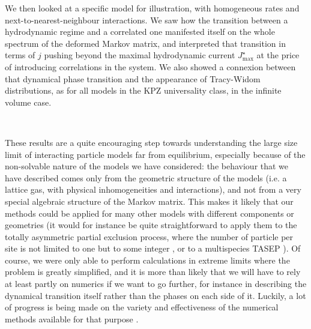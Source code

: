 \documentclass[aps,pre,onecolumn,showpacs,showkeys,a4paper]{revtex4-1}
\begin{document}
We then looked at a specific model for illustration, with homogeneous rates and next-to-nearest-neighbour interactions. We saw how the transition between a hydrodynamic regime and a correlated one manifested itself on the whole spectrum of the deformed Markov matrix, and interpreted that transition in terms of $j$ pushing beyond the maximal hydrodynamic current $J^\star_{\mathrm{max}}$ at the price of introducing correlations in the system. We also showed a connexion between that dynamical phase transition and the appearance of Tracy-Widom distributions, as for all models in the KPZ universality class, in the infinite volume case.


~~

These results are a quite encouraging step towards understanding the large size limit of interacting particle models far from equilibrium, especially because of the non-solvable nature of the models we have considered: the behaviour that we have described comes only from the geometric structure of the models (i.e. a lattice gas, with physical inhomogeneities and interactions), and not from a very special algebraic structure of the Markov matrix. This makes it likely that our methods could be applied for many other models with different components or geometries (it would for instance be quite straightforward to apply them to the totally asymmetric partial exclusion process, where the number of particle per site is not limited to one but to some integer \cite{Arita2014}, or to a multispecies TASEP \cite{Crampe2016,Crampe}). Of course, we were only able to perform calculations in extreme limits where the problem is greatly simplified, and it is more than likely that we will have to rely at least partly on numerics if we want to go further, for instance in describing the dynamical transition itself rather than the phases on each side of it. Luckily, a lot of progress is being made on the variety and effectiveness of the numerical methods available for that purpose \cite{Gorissen2009,giardina2011simulating,Espigares2013,Nemoto2016}.
\end{document}
